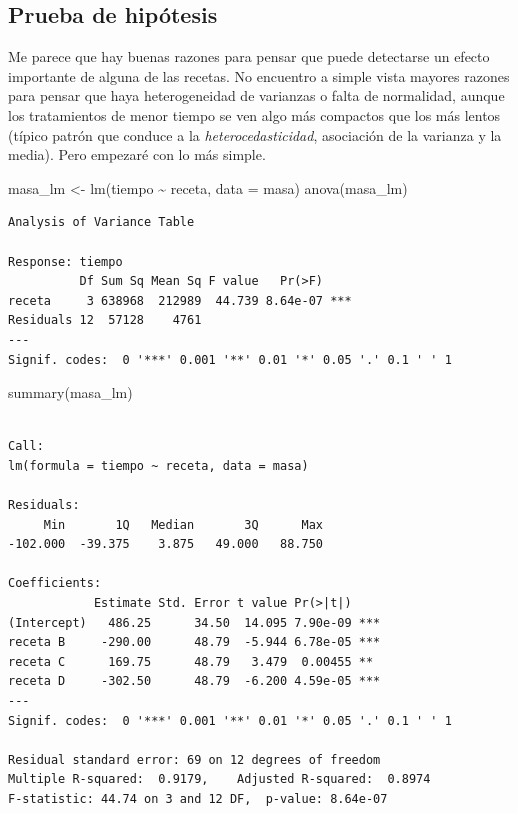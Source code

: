 \documentclass[
  letterpaper,
  DIV=11,
  numbers=noendperiod]{scrartcl}
\newenvironment{Shaded}{\begin{snugshade}}{\end{snugshade}}
\newcommand{\AttributeTok}[1]{\textcolor[rgb]{0.40,0.45,0.13}{#1}}
\newcommand{\FunctionTok}[1]{\textcolor[rgb]{0.28,0.35,0.67}{#1}}
\newcommand{\NormalTok}[1]{\textcolor[rgb]{0.00,0.23,0.31}{#1}}
\newcommand{\OtherTok}[1]{\textcolor[rgb]{0.00,0.23,0.31}{#1}}
\newcommand{\SpecialCharTok}[1]{\textcolor[rgb]{0.37,0.37,0.37}{#1}}
\begin{document}
\subsection{Prueba de hipótesis}\label{prueba-de-hipuxf3tesis}

Me parece que hay buenas razones para pensar que puede detectarse un
efecto importante de alguna de las recetas. No encuentro a simple vista
mayores razones para pensar que haya heterogeneidad de varianzas o falta
de normalidad, aunque los tratamientos de menor tiempo se ven algo más
compactos que los más lentos (típico patrón que conduce a la
\emph{heterocedasticidad}, asociación de la varianza y la media). Pero
empezaré con lo más simple.

\begin{Shaded}
\begin{Highlighting}[]
\NormalTok{masa\_lm }\OtherTok{\textless{}{-}} \FunctionTok{lm}\NormalTok{(tiempo }\SpecialCharTok{\textasciitilde{}}\NormalTok{ receta, }\AttributeTok{data =}\NormalTok{ masa)}
\FunctionTok{anova}\NormalTok{(masa\_lm)}
\end{Highlighting}
\end{Shaded}

\begin{verbatim}
Analysis of Variance Table

Response: tiempo
          Df Sum Sq Mean Sq F value   Pr(>F)    
receta     3 638968  212989  44.739 8.64e-07 ***
Residuals 12  57128    4761                     
---
Signif. codes:  0 '***' 0.001 '**' 0.01 '*' 0.05 '.' 0.1 ' ' 1
\end{verbatim}

\begin{Shaded}
\begin{Highlighting}[]
\FunctionTok{summary}\NormalTok{(masa\_lm)}
\end{Highlighting}
\end{Shaded}

\begin{verbatim}

Call:
lm(formula = tiempo ~ receta, data = masa)

Residuals:
     Min       1Q   Median       3Q      Max 
-102.000  -39.375    3.875   49.000   88.750 

Coefficients:
            Estimate Std. Error t value Pr(>|t|)    
(Intercept)   486.25      34.50  14.095 7.90e-09 ***
receta B     -290.00      48.79  -5.944 6.78e-05 ***
receta C      169.75      48.79   3.479  0.00455 ** 
receta D     -302.50      48.79  -6.200 4.59e-05 ***
---
Signif. codes:  0 '***' 0.001 '**' 0.01 '*' 0.05 '.' 0.1 ' ' 1

Residual standard error: 69 on 12 degrees of freedom
Multiple R-squared:  0.9179,    Adjusted R-squared:  0.8974 
F-statistic: 44.74 on 3 and 12 DF,  p-value: 8.64e-07
\end{verbatim}
\end{document}
